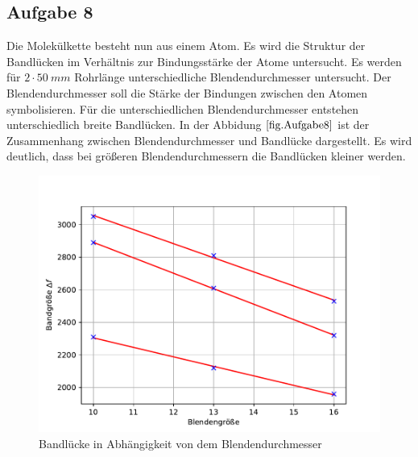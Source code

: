 \subsection{Aufgabe 8}
Die Molekülkette besteht nun aus einem Atom.
Es wird die Struktur der Bandlücken im Verhältnis zur Bindungsstärke der Atome untersucht.
Es werden für $2 \cdot \SI{50}{mm}$ Rohrlänge unterschiedliche Blendendurchmesser untersucht. Der Blendendurchmesser soll die Stärke der Bindungen zwischen den Atomen symbolisieren.
Für die unterschiedlichen Blendendurchmesser entstehen unterschiedlich breite Bandlücken.
In der Abbidung $\ref{fig.Aufgabe8}$ ist der Zusammenhang zwischen Blendendurchmesser und Bandlücke dargestellt.
Es wird deutlich, dass bei größeren Blendendurchmessern die Bandlücken kleiner werden.
\begin{figure}[h!]
  \centering
  \includegraphics[width=\textwidth]{A8.pdf}
  \caption{Bandlücke in Abhängigkeit von dem Blendendurchmesser}
  \label{fig.Aufgabe8}
\end{figure}
\FloatBarrier

